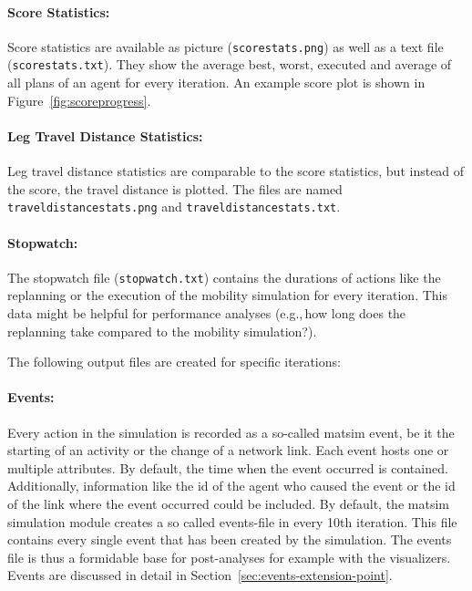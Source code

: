 \paragraph{Score Statistics:}
Score statistics are available as picture (\lstinline|scorestats.png|) as well as a text file (\lstinline|scorestats.txt|). They show the average best, worst, executed and average of all plans of an agent for every iteration. An example score plot is shown in Figure~\ref{fig:scoreprogress}.

\paragraph{Leg Travel Distance Statistics:}
Leg travel distance statistics are comparable to the score statistics, but instead of the score, the travel distance is plotted. The files are named \lstinline|traveldistancestats.png| and \lstinline|traveldistancestats.txt|.

\paragraph{Stopwatch:}
The stopwatch file (\lstinline|stopwatch.txt|) contains the durations of actions like the replanning or the execution of the mobility simulation for every iteration. This data might be helpful for performance analyses (e.g.,\,how long does the replanning take compared to the mobility simulation?).


The following output files are created for specific iterations:

\paragraph{Events:} Every action in the simulation is recorded as a so-called \gls{matsim} \gls{event}, be it the starting of an activity or the change of a network link. Each \gls{event} hosts one or multiple attributes. By default, the time when the \gls{event} occurred is contained. Additionally, information like the id of the agent who caused the event or the id of the link where the \gls{event} occurred could be included. By default, the \gls{matsim} simulation module creates a so called events-file in every 10th iteration. This file contains every single \gls{event} that has been created by the simulation. The events file is thus a formidable base for post-analyses for example with the visualizers. Events are discussed in detail in Section~\ref{sec:events-extension-point}.

